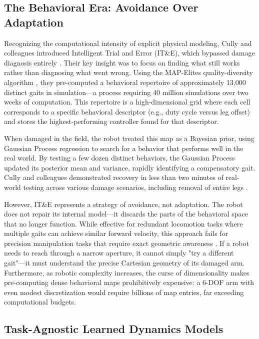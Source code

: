 \documentclass[12pt,a4paper,oneside]{report}
\begin{document}
\subsection{The Behavioral Era: Avoidance Over Adaptation}

Recognizing the computational intensity of explicit physical modeling, Cully and colleagues introduced Intelligent Trial and Error (IT\&E), which bypassed damage diagnosis entirely \cite{cully2015robots}. Their key insight was to focus on finding what still works rather than diagnosing what went wrong. Using the MAP-Elites quality-diversity algorithm \cite{mouret2015illuminating}, they pre-computed a behavioral repertoire of approximately 13,000 distinct gaits in simulation—a process requiring 40 million simulations over two weeks of computation. This repertoire is a high-dimensional grid where each cell corresponds to a specific behavioral descriptor (e.g., duty cycle versus leg offset) and stores the highest-performing controller found for that descriptor.

When damaged in the field, the robot treated this map as a Bayesian prior, using Gaussian Process regression to search for a behavior that performs well in the real world. By testing a few dozen distinct behaviors, the Gaussian Process updated its posterior mean and variance, rapidly identifying a compensatory gait. Cully and colleagues demonstrated recovery in less than two minutes of real-world testing across various damage scenarios, including removal of entire legs \cite{cully2015robots}.

However, IT\&E represents a strategy of avoidance, not adaptation. The robot does not repair its internal model—it discards the parts of the behavioral space that no longer function. While effective for redundant locomotion tasks where multiple gaits can achieve similar forward velocity, this approach fails for precision manipulation tasks that require exact geometric awareness \cite{kwiatkowski2019task}. If a robot needs to reach through a narrow aperture, it cannot simply "try a different gait"—it must understand the precise Cartesian geometry of its damaged arm. Furthermore, as robotic complexity increases, the curse of dimensionality makes pre-computing dense behavioral maps prohibitively expensive: a 6-DOF arm with even modest discretization would require billions of map entries, far exceeding computational budgets.

\subsection{Task-Agnostic Learned Dynamics Models}
\end{document}
